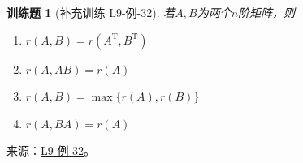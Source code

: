 \documentclass[UTF8,12pt,a4paper,fontset=fandol]{ctexart}
\newtheorem{exercise}{训练题}[section]
\begin{document}
\begin{exercise}[补充训练 L9-例-32]\label{prob:L9-例-32}
若$A,B$为两个$n$阶矩阵，则
    \begin{enumerate}[label=\Alph*.]
        \item $r(A,B)=r(A^\mathrm{T},B^\mathrm{T})$

        \item $r(A,AB)=r(A)$

        \item $r(A,B)=\max\{r(A), r(B)\}$

        \item $r(A,BA)=r(A)$
    \end{enumerate}
\end{exercise}
\noindent 来源：\href{https://github.com/yhwu-is/Linear-Algebra-Left-Undone/blob/new/%E8%AE%B2%E4%B9%89/%E4%B8%93%E9%A2%98/9%20%E7%9F%A9%E9%98%B5%E8%BF%90%E7%AE%97%E8%BF%9B%E9%98%B6.tex}{L9-例-32}。
\end{document}
